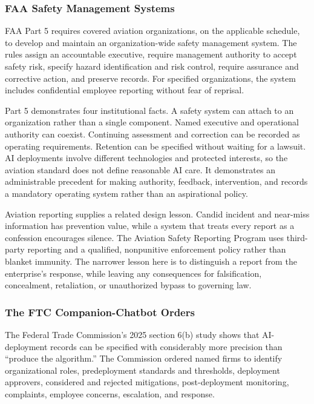 \subsubsection{FAA Safety Management Systems}

FAA Part 5 requires covered aviation organizations, on the applicable schedule, to develop and maintain an organization-wide safety management system. The rules assign an accountable executive, require management authority to accept safety risk, specify hazard identification and risk control, require assurance and corrective action, and preserve records. For specified organizations, the system includes confidential employee reporting without fear of reprisal.

Part 5 demonstrates four institutional facts. A safety system can attach to an organization rather than a single component. Named executive and operational authority can coexist. Continuing assessment and correction can be recorded as operating requirements. Retention can be specified without waiting for a lawsuit. AI deployments involve different technologies and protected interests, so the aviation standard does not define reasonable AI care. It demonstrates an administrable precedent for making authority, feedback, intervention, and records a mandatory operating system rather than an aspirational policy.

Aviation reporting supplies a related design lesson. Candid incident and near-miss information has prevention value, while a system that treats every report as a confession encourages silence. The Aviation Safety Reporting Program uses third-party reporting and a qualified, nonpunitive enforcement policy rather than blanket immunity. The narrower lesson here is to distinguish a report from the enterprise's response, while leaving any consequences for falsification, concealment, retaliation, or unauthorized bypass to governing law.

\subsubsection{The FTC Companion-Chatbot Orders}

The Federal Trade Commission's 2025 section 6(b) study shows that AI-deployment records can be specified with considerably more precision than ``produce the algorithm.'' The Commission ordered named firms to identify organizational roles, predeployment standards and thresholds, deployment approvers, considered and rejected mitigations, post-deployment monitoring, complaints, employee concerns, escalation, and response.

